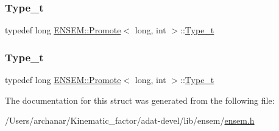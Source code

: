 \subsubsection{\texorpdfstring{Type\_t}{Type\_t}\hspace{0.1cm}{\footnotesize\ttfamily [2/3]}}
{\footnotesize\ttfamily typedef long \mbox{\hyperlink{structENSEM_1_1Promote}{E\+N\+S\+E\+M\+::\+Promote}}$<$ long, int $>$\+::\mbox{\hyperlink{structENSEM_1_1Promote_3_01long_00_01int_01_4_a98c4c916d9b142fd471add21a6769683}{Type\+\_\+t}}}

\mbox{\label{structENSEM_1_1Promote_3_01long_00_01int_01_4_a98c4c916d9b142fd471add21a6769683}} 
\subsubsection{\texorpdfstring{Type\_t}{Type\_t}\hspace{0.1cm}{\footnotesize\ttfamily [3/3]}}
{\footnotesize\ttfamily typedef long \mbox{\hyperlink{structENSEM_1_1Promote}{E\+N\+S\+E\+M\+::\+Promote}}$<$ long, int $>$\+::\mbox{\hyperlink{structENSEM_1_1Promote_3_01long_00_01int_01_4_a98c4c916d9b142fd471add21a6769683}{Type\+\_\+t}}}



The documentation for this struct was generated from the following file\+:\begin{DoxyCompactItemize}
\item 
/\+Users/archanar/\+Kinematic\+\_\+factor/adat-\/devel/lib/ensem/\mbox{\hyperlink{adat-devel_2lib_2ensem_2ensem_8h}{ensem.\+h}}\end{DoxyCompactItemize}

